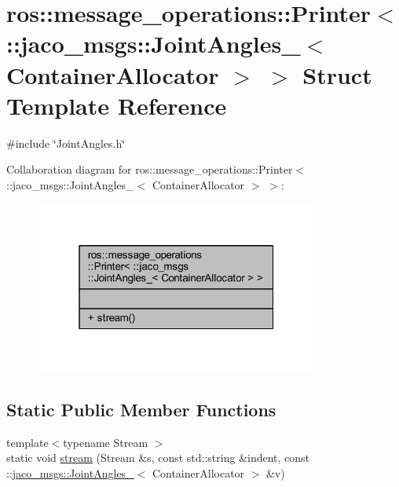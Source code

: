 \hypertarget{structros_1_1message__operations_1_1Printer_3_01_1_1jaco__msgs_1_1JointAngles___3_01ContainerAllocator_01_4_01_4}{}\section{ros\+:\+:message\+\_\+operations\+:\+:Printer$<$ \+:\+:jaco\+\_\+msgs\+:\+:Joint\+Angles\+\_\+$<$ Container\+Allocator $>$ $>$ Struct Template Reference}
\label{structros_1_1message__operations_1_1Printer_3_01_1_1jaco__msgs_1_1JointAngles___3_01ContainerAllocator_01_4_01_4}


{\ttfamily \#include \char`\"{}Joint\+Angles.\+h\char`\"{}}



Collaboration diagram for ros\+:\+:message\+\_\+operations\+:\+:Printer$<$ \+:\+:jaco\+\_\+msgs\+:\+:Joint\+Angles\+\_\+$<$ Container\+Allocator $>$ $>$\+:
\nopagebreak
\begin{figure}[H]
\begin{center}
\leavevmode
\includegraphics[width=265pt]{d0/de6/structros_1_1message__operations_1_1Printer_3_01_1_1jaco__msgs_1_1JointAngles___3_01ContainerAllocator_01_4_01_4__coll__graph}
\end{center}
\end{figure}
\subsection*{Static Public Member Functions}
\begin{DoxyCompactItemize}
\item 
{\footnotesize template$<$typename Stream $>$ }\\static void \hyperlink{structros_1_1message__operations_1_1Printer_3_01_1_1jaco__msgs_1_1JointAngles___3_01ContainerAllocator_01_4_01_4_a9fb951e53c4096c361fcb2b541c90865}{stream} (Stream \&s, const std\+::string \&indent, const \+::\hyperlink{structjaco__msgs_1_1JointAngles__}{jaco\+\_\+msgs\+::\+Joint\+Angles\+\_\+}$<$ Container\+Allocator $>$ \&v)
\end{DoxyCompactItemize}


